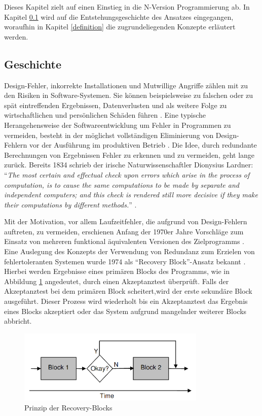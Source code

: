%
Dieses Kapitel zielt auf einen Einstieg in die N-Version Programmierung ab. In Kapitel \ref{geschichte} wird auf die Entstehungsgeschichte des Ansatzes eingegangen, woraufhin in Kapitel \ref{definition} die zugrundeliegenden Konzepte erläutert werden.
\subsection{Geschichte}\label{geschichte}
%
Design-Fehler, inkorrekte Installationen und Mutwillige Angriffe zählen mit zu den Risiken in Software-Systemen. Sie können beispielsweise zu falschen oder zu spät eintreffenden Ergebnissen, Datenverlusten und als weitere Folge zu wirtschaftlichen und persönlichen Schäden führen \cite{Laprie:1995:DCC:1899254.1899261}.
Eine typische Herangehensweise der Softwareentwicklung um Fehler in Programmen zu vermeiden, besteht in der möglichst vollständigen Eliminierung von Design-Fehlern vor der Ausführung im produktiven Betrieb \cite{Avizienis:1975:FFC:800027.808469}. 
Die Idee, durch redundante Berechnungen von Ergebnissen Fehler zu erkennen und zu vermeiden, geht lange zurück. Bereits 1834 schrieb der irische Naturwissenschaftler Dionysius Lardner: \enquote{\emph{The most certain and effectual check upon errors which arise in the process of computation,	is to cause the same computations to be made by separate and independent computers; and this	check is rendered still more decisive if they make their computations by different methods.}} \cite{lardner}.
%

%
Mit der Motivation, vor allem Laufzeitfehler, die aufgrund von Design-Fehlern auftreten, zu vermeiden, erschienen Anfang der 1970er Jahre Vorschläge zum Einsatz von mehreren funktional äquivalenten Versionen des Zielprogramms \cite{methodology}.
Eine Auslegung des Konzepts der Verwendung von Redundanz zum Erzielen von fehlertoleranten Systemen wurde 1974 als \enquote{Recovery Block}-Ansatz bekannt \cite{Horning:1974:PSE:647641.733522}.
Hierbei werden Ergebnisse eines primären Blocks des Programms, wie in Abbildung \ref{graph-recovery} angedeutet, durch einen Akzeptanztest überprüft.
Falls der Akzeptanztest bei dem primären Block scheitert,wird der erste sekundäre Block ausgeführt. Dieser Prozess wird wiederholt bis ein Akzeptanztest das Ergebnis eines Blocks akzeptiert oder das System aufgrund mangelnder weiterer Blocks abbricht.
%
%
\begin{figure}[ht]
	\centering
	\includegraphics[width=0.8\textwidth,natwidth=901,natheight=351]{grafiken/recovery-block.png}
	\caption{Prinzip der Recovery-Blocks \cite{lucent}}
	\label{graph-recovery}
\end{figure}
%


